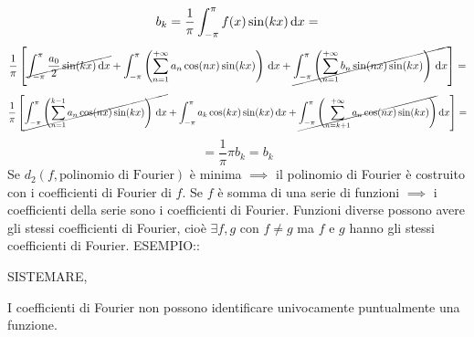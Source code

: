\[b_k=\frac{1}{\pi}\int_{-\pi}^{\pi}f(x)\sin(kx)\,\mathrm{d}{x}=\]
\[\frac{1}{\pi}\left[
\cancel{\int_{-\pi}^{\pi}\frac{a_0}{2}\sin(kx)\,\mathrm{d}{x}}+
\int_{-\pi}^{\pi}\left(\sum\limits_{n=1}^{+\infty}a_n\cos(nx)\sin(kx)\right)\,\mathrm{d}{x}+
\cancel{\int_{-\pi}^{\pi}\left(\sum\limits_{n=1}^{+\infty}b_n\sin(nx)\sin(kx)\right)\,\mathrm{d}{x}}
\right]=\]
\[\frac{1}{\pi}\left[
\cancel{\int_{-\pi}^{\pi}\left(\sum\limits_{n=1}^{k-1} a_n\cos(nx)\sin(kx)\right)\,\mathrm{d}{x}}+
\int_{-\pi}^{\pi}a_k\cos(kx)\sin(kx)\,\mathrm{d}{x}+
\cancel{\int_{-\pi}^{\pi}\left(\sum\limits_{n=k+1}^{+\infty}a_n\cos(nx)\sin(kx)\right)}\,\mathrm{d}{x}
\right]=\]
\[=\frac{1}{\pi}\pi b_k=b_k\]
\observation
Se $d_2(f,\text{polinomio di Fourier})$ \`{e} minima $\implies$ il polinomio di Fourier \`{e} costruito con i coefficienti di Fourier di $f$.
\observation
Se $f$ \`{e} somma di una serie di funzioni $\implies$ i coefficienti della serie sono i coefficienti di Fourier.
\observation
Funzioni diverse possono avere gli stessi coefficienti di Fourier, cio\`{e} $\exists f,g$ con $f\ne g$ ma $f$ e $g$  hanno gli stessi coefficienti di Fourier.
ESEMPIO::
\begin{center}
	SISTEMARE,
\end{center}
\observation
I coefficienti di Fourier non possono identificare univocamente puntualmente una funzione.
